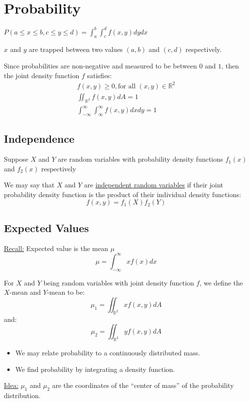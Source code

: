 \documentclass[12pt]{article}
\begin{document}
\section{Probability}
\(P(a \leq x \leq b, c \leq y \leq d) = \int_{a}^{b} \int_{c}^{d} f(x,y)dydx\)

\(x\) and \(y\) are trapped between two values \((a,b)\) and \((c,d)\) respectively.

Since probabilities are non-negative and measured to be between \(0\) and \(1\), then the joint density function \(f\) satisfies:
\begin{align*}
	f(x,y) \geq 0, \text{for all } (x,y) \in \mathbb{R}^2 \\
	\iint_{\mathbb{R}^2}f(x,y)dA = 1 \\
	\int_{-\infty}^{\infty} \int_{\infty}^{\infty} f(x,y)dxdy = 1
\end{align*}

\subsection{Independence}
Suppose \(X\) and \(Y\) are random variables with probability density functions \(f_1(x)\) and \(f_2(x)\) respectively

We may say that \(X\) and \(Y\) are \underline{independent random variables} if their joint probability density function is the product of their individual density functions:
\[
	f(x,y) = f_1(X) f_2(Y)
\]

\subsection{Expected Values}
\underline{Recall:} Expected value is the mean \(\mu\)
\[
	\mu = \int_{-\infty}^{\infty} xf(x)dx
\]

For  \(X\) and \(Y\) being random variables with joint density function \(f\), we define the \(X\)-mean and \(Y\)-mean to be: 
\[
	\mu_1 = \iint_{\mathbb{R}^2}xf(x,y)dA
\]
and:
\[
	\mu_2 = \iint_{\mathbb{R}^2}yf(x,y)dA
\]

\begin{itemize}
	\item We may relate probability to a continuously distributed mass.
	\item We find probability by integrating a density function.
\end{itemize}
\underline{Idea:} \(\mu_1\) and \(\mu_2\) are the coordinates of the ``center of mass'' of the probability distribution.
\end{document}
